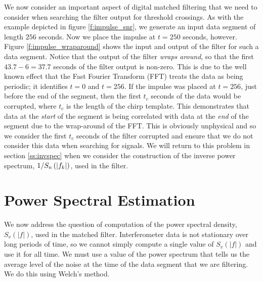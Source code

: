 We now consider an important aspect of digital matched filtering that we need
to consider when searching the filter output for threshold crossings. As with
the example depicted in figure \ref{f:impulse_snr}, we generate an input data
segment of length  $256$ seconds. Now we place the impulse at $t = 250$
seconds, however. Figure \ref{f:impulse_wraparound} shows the input and output
of the filter for such a data segment. Notice that the output of the filter
\emph{wraps around}, so that the first $43.7-6 = 37.7$ seconds of the filter
output is non-zero. This is due to the well known effect that the Fast Fourier
Transform (FFT) treats the data as being periodic; it identifies $t=0$ and
$t=256$. If the impulse was placed at $t=256$, just before the end of the
segment, then the first $t_c$ seconds of the data would be corrupted, where
$t_c$ is the length of the chirp template. This demonstrates that data at the
\emph{start} of the segment is being correlated with data at the \emph{end} of
the segment due to the wrap-around of the FFT. This is obviously unphysical
and so we consider the first $t_c$ seconds of the filter corrupted and ensure
that we do not consider this data when searching for signals. We will return
to this problem in section \ref{ss:invspec} when we consider the construction
of the inverse power spectrum, $1/S_n\left(\left|f_{k}\right|\right)$, used in the filter.

\section{Power Spectral Estimation}
\label{ss:psd}

We now address the question of computation of the power spectral density,
$S_v(|f|)$, used in the matched filter. Interferometer data is not stationary
over long periods of time, so we cannot simply compute a single value of
$S_v(|f|)$ and use it for all time. We must use a value of the power spectrum
that tells us the average level of the noise at the time of the data segment
that we are filtering. We do this using Welch's method\cite{Welch:1967}.

